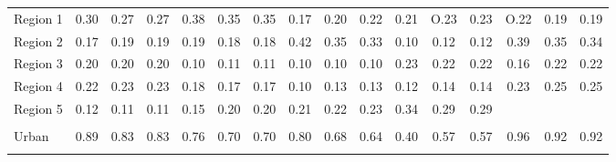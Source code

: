\begin{tabular}{l*{15}{c}}
\\
Region 1 & 0.30 & 0.27 & 0.27 & 0.38 & 0.35 & 0.35 & 0.17 & 0.20 & 0.22 & 0.21 & O.23 & 0.23 & O.22 & 0.19 & 0.19 \\
Region 2 & 0.17 & 0.19 & 0.19 & 0.19 & 0.18 & 0.18 & 0.42 & 0.35 & 0.33 & 0.10 & 0.12 & 0.12 & 0.39 & 0.35 & 0.34 \\
Region 3 & 0.20 & 0.20 & 0.20 & 0.10 & 0.11 & 0.11 & 0.10 & 0.10 & 0.10 & 0.23 & 0.22 & 0.22 & 0.16 & 0.22 & 0.22 \\
Region 4 & 0.22 & 0.23 & 0.23 & 0.18 & 0.17 & 0.17 & 0.10 & 0.13 & 0.13 & 0.12 & 0.14 & 0.14 & 0.23 & 0.25 & 0.25 \\
Region 5 & 0.12 & 0.11 & 0.11 & 0.15 & 0.20 & 0.20 & 0.21 & 0.22 & 0.23 & 0.34 & 0.29 & 0.29 & & & \\
\\
Urban & 0.89 & 0.83 & 0.83 & 0.76 & 0.70 & 0.70 & 0.80 & 0.68 & 0.64 & 0.40 & 0.57 & 0.57 & 0.96 & 0.92 & 0.92 \\
\\
\bottomrule
\end{tabular}